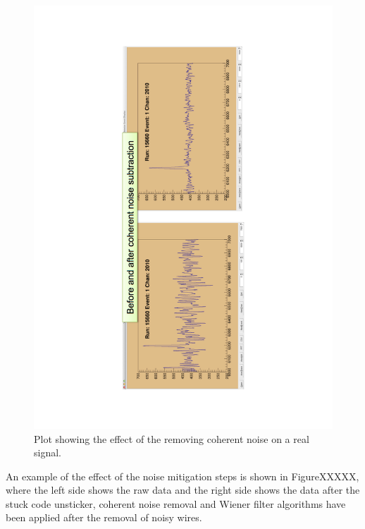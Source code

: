 \begin{figure}[h!]
  \centering
  \includegraphics[width=\textwidth]{CoherentNoise}
  \caption[Removing coherent noise in the 35 ton]{Plot showing the effect of the removing coherent noise on a real signal.}
  \label{fig:CoherentNoise}
\end{figure}

An example of the effect of the noise mitigation steps is shown in FigureXXXXX, where the left side shows the raw data and the right side shows the data after the stuck code unsticker, coherent noise removal and Wiener filter algorithms have been applied after the removal of noisy wires. \\

